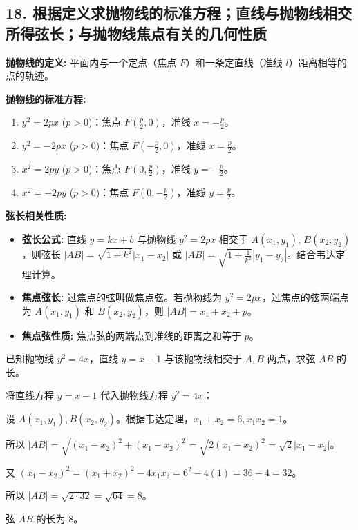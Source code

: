 \subsection*{18. 根据定义求抛物线的标准方程；直线与抛物线相交所得弦长；与抛物线焦点有关的几何性质}

\begin{theorem}
    \textbf{抛物线的定义:} 平面内与一个定点（焦点 $F$）和一条定直线（准线 $l$）距离相等的点的轨迹。

    \textbf{抛物线的标准方程:}
    \begin{enumerate}
        \item $y^2 = 2px$ ($p>0$)：焦点 $F(\frac{p}{2}, 0)$，准线 $x = -\frac{p}{2}$。
        \item $y^2 = -2px$ ($p>0$)：焦点 $F(-\frac{p}{2}, 0)$，准线 $x = \frac{p}{2}$。
        \item $x^2 = 2py$ ($p>0$)：焦点 $F(0, \frac{p}{2})$，准线 $y = -\frac{p}{2}$。
        \item $x^2 = -2py$ ($p>0$)：焦点 $F(0, -\frac{p}{2})$，准线 $y = \frac{p}{2}$。
    \end{enumerate}

    \textbf{弦长相关性质:}
    \begin{itemize}
        \item \textbf{弦长公式:} 直线 $y=kx+b$ 与抛物线 $y^2=2px$ 相交于 $A(x_1, y_1)$, $B(x_2, y_2)$，则弦长 $|AB| = \sqrt{1+k^2}|x_1-x_2|$ 或 $|AB| = \sqrt{1+\frac{1}{k^2}}|y_1-y_2|$。结合韦达定理计算。

        \item \textbf{焦点弦长:} 过焦点的弦叫做焦点弦。若抛物线为 $y^2=2px$，过焦点的弦两端点为 $A(x_1, y_1)$ 和 $B(x_2, y_2)$，则 $|AB| = x_1+x_2+p$。
        \item \textbf{焦点弦性质:} 焦点弦的两端点到准线的距离之和等于 $p$。
    \end{itemize}
\end{theorem}

\begin{example}
    已知抛物线 $y^2 = 4x$，直线 $y = x - 1$ 与该抛物线相交于 $A, B$ 两点，求弦 $AB$ 的长。
\end{example}

\begin{solution}
    将直线方程 $y = x - 1$ 代入抛物线方程 $y^2 = 4x$：

    设 $A(x_1, y_1), B(x_2, y_2)$。根据韦达定理，$x_1+x_2 = 6, x_1x_2 = 1$。

    所以 $|AB| = \sqrt{(x_1-x_2)^2 + (x_1-x_2)^2} = \sqrt{2(x_1-x_2)^2} = \sqrt{2}|x_1-x_2|$。

    又 $(x_1-x_2)^2 = (x_1+x_2)^2 - 4x_1x_2 = 6^2 - 4(1) = 36 - 4 = 32$。

    所以 $|AB| = \sqrt{2 \cdot 32} = \sqrt{64} = 8$。

    弦 $AB$ 的长为 $8$。
\end{solution}

